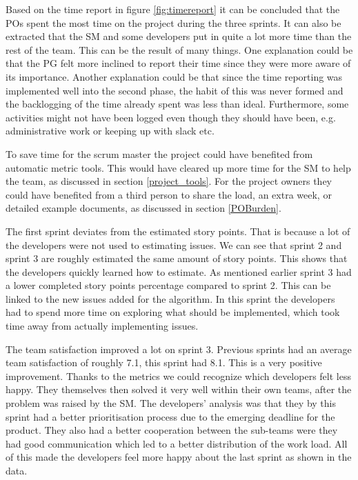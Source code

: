 \documentclass{article}
\begin{document}
Based on the time report in figure \ref{fig:timereport} it can be concluded that the POs spent the most time on the project during the three sprints. It can also be extracted that the SM and some developers put in quite a lot more time than the rest of the team. This can be the result of many things. One explanation could be that the PG felt more inclined to report their time since they were more aware of its importance. Another explanation could be that since the time reporting was implemented well into the second phase, the habit of this was never formed and the backlogging of the time already spent was less than ideal. Furthermore, some activities might not have been logged even though they should have been, e.g. administrative work or keeping up with slack etc.

To save time for the scrum master the project could have benefited from automatic metric tools. This would have cleared up more time for the SM to help the team, as discussed in section \ref{project_tools}. For the project owners they could have benefited from a third person to share the load, an extra week, or detailed example documents, as discussed in section \ref{POBurden}.

The first sprint deviates from the estimated story points. That is because a lot of the developers were not used to estimating issues. We can see that sprint 2 and sprint 3 are roughly estimated the same amount of story points. This shows that the developers quickly learned how to estimate. As mentioned earlier sprint 3 had a lower completed story points percentage compared to sprint 2. This can be linked to the new issues added for the algorithm. In this sprint the developers had to spend more time on exploring what should be implemented, which took time away from actually implementing issues.

The team satisfaction improved a lot on sprint 3. Previous  sprints had an average team satisfaction of roughly 7.1, this sprint had 8.1. This is a very positive improvement. Thanks to the metrics we could recognize which developers felt less happy. They themselves then solved it very well within their own teams, after the problem was raised by the SM. The developers' analysis was that they by this sprint had a better prioritisation process due to the emerging deadline for the product. They also had a better cooperation between the sub-teams were they had good communication which led to a better distribution of the work load. All of this made the developers feel more happy about the last sprint as shown in the data.
\end{document}
